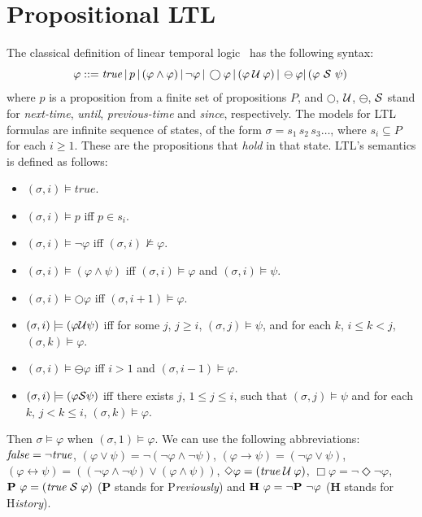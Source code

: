 
\newcommand\eventty{\mathbb{E}}
\newcommand\setof[1]{\mathcal{P}(#1)}


\section{Propositional LTL}
\label{propLTL}

The classical definition of linear temporal logic~\cite{MP} has the following syntax:
\[ \varphi ::= \mathit{true} \, | \,  p \, | \, ( \varphi \wedge \varphi ) \, |  \, \neg  \varphi \, |   \, \bigcirc \varphi \, |  
\, ( \varphi  \mathbin{\mathcal{U}}  \varphi ) \,|  \, \ominus \varphi |
   \, ( \varphi \ {\cal S} \ \psi ) \,  \]
where $p$ is a proposition from a finite set of propositions $P$, and $\bigcirc$, $\mathbin{\mathcal{U}}$, $\ominus$, ${\cal S}$ stand for {\em next-time}, 
{\em until}, {\em previous-time} and {\em since}, respectively.
%
The models for LTL formulas 
are infinite sequence of states, of the form
$\sigma =  s_{1}\, s_{2}\, s_3 \ldots$,
where $s_i \subseteq P$ for each $i\geq 1$. These are the propositions that {\em hold} in that state.
LTL's semantics is defined as follows:
\begin{itemize}
\item $( \sigma, {i}) \models \mathit{true}$. \ \ \ \ \ 
\item $(\sigma, {i}) \models p$ iff $p \in s_{i}$. \ 
\item $(\sigma, {i}) \models \neg\varphi$ iff  $(\sigma, {i}) \not\models \varphi$.
\item $(\sigma, {i}) \models ( \varphi \land \psi)$ iff $(\sigma, {i}) \models \varphi$ and $(\sigma, {i} ) \models \psi$.
\item $(\sigma, {i}) \models \bigcirc \varphi$ iff $(\sigma, {i+1}) \models \varphi$.
\item $(\sigma, {i}) \models ( \varphi  \cal{U}  \psi )$ iff for some $j$,
$j\geq i$, $(\sigma, {j}) \models \psi$,
and for each $k$, $i \leq k < j$, $(\sigma, {k}) \models \varphi$.
\item $(\sigma , i) \models \ominus \varphi$ iff $i > 1$ and $(\sigma, i-1) \models \varphi$.
\item $(\sigma , i) \models (\varphi {\cal S} \psi)$ iff there exists $j$, $1 \leq j \leq i$, such that
$(\sigma , j)  \models \psi$ and for each
$k$, $j < k \leq i$, $(\sigma , k ) \models \varphi$.
\end{itemize}
Then $\sigma \models \varphi$ when $( \sigma ,1 ) \models \varphi$.
We can use the following abbreviations:
$\mathit{false} = \neg \mathit{true}$, 
$(\varphi \vee \psi) = \neg ( \neg \varphi \wedge \neg \psi )$, 
$(\varphi \rightarrow \psi) = ( \neg \varphi \vee \psi)$,
$(\varphi \leftrightarrow \psi) = ((\neg \varphi \wedge \neg \psi) \vee (\varphi \wedge \psi ))$,
$\Diamond \varphi = (\mathit{true} \mathbin{\mathcal{U}} \varphi)$, $\Box \varphi = \neg \Diamond \neg \varphi$,
${\bf P}\  \varphi = (\mathit{true} \; {\cal S} \; \varphi)$ ({\bf P} stands for P{\em reviously}) and 
${\bf H}\  \varphi = \neg {\bf P}\ \neg \varphi$ ({\bf H} stands for 
H{\em istory}).



